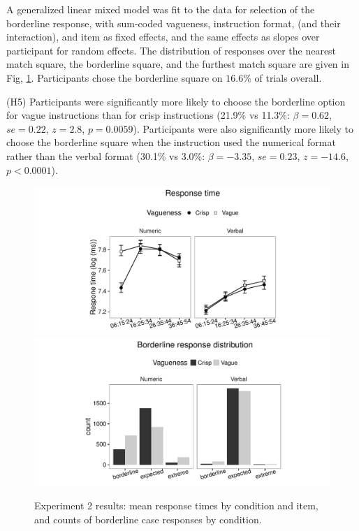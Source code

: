 \documentclass[%
man,		%
floatsintext,%
apacite%
]{apa6}
\begin{document}
A generalized linear mixed model \cite{jaeger2008categorical} was fit to the data for selection of the borderline response, with sum-coded vagueness, instruction format, (and their interaction), and item as fixed effects, and the same effects as slopes over participant for random effects. The distribution of responses over the nearest match square, the borderline square, and the furthest match square are given in Fig, \ref{resultse2}. Participants chose the borderline square on $16.6\%$ of trials overall.
{\small 
\begin{APAenumerate}
	\item [(H5)] Participants were significantly more likely to choose the borderline option for vague instructions than for crisp instructions (21.9\% vs 11.3\%: $\beta=0.62$, $se=0.22$, $z=2.8$, $p=0.0059$). Participants were also significantly more likely to choose the borderline square when the instruction used the numerical format rather than the verbal format (30.1\% vs 3.0\%: $\beta=-3.35$, $se=0.23$, $z=-14.6$, $p<0.0001$). 
\end{APAenumerate}
}

\begin{figure}[htbp]
\centering
\includegraphics[trim = 20mm 0mm 35mm 0mm, clip, width=.49\textwidth]{images/e2-rtplot-1.pdf}
\includegraphics[trim = 20mm 0mm 35mm 0mm, clip, width=.49\textwidth]{images/e2-blBarChart-1}
\caption{Experiment 2 results: mean response times by condition and item, and counts of borderline case responses by condition.}
\label{resultse2}
\end{figure}
\end{document}
